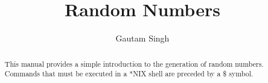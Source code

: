 \documentclass[journal,12pt,twocolumn]{IEEEtran}
\begin{document}
\renewcommand{\thefigure}{\arabic{section}.\arabic{figure}}



\let\StandardTheFigure\thefigure
\let\StandardTheTable\thetable
\let\vec\mathbf
{}

\vspace{3cm}


\title{%
	Random Numbers
}

%
%
%

\author{Gautam Singh}
\maketitle

\tableofcontents

\bigskip


\begin{abstract}
	This manual provides a simple introduction to the generation of random numbers. Commands that must be executed in a *NIX shell are preceded by a \$ symbol.
\end{abstract}
\end{document}
